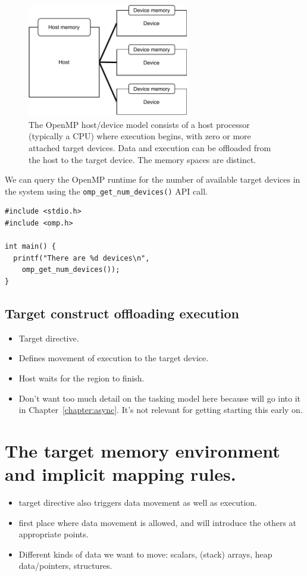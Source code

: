 \begin{figure}[t]
\label{fig:host_device}
\centerline{\includegraphics[width=200pt]{figures/host_device.pdf}}
\caption[The OpenMP host/device model consits of a host processor (typically a CPU) where execution begins, with zero or more attached target devices.
Data and execution can be offloaded from the host to the target device.
The memory spaces are distinct.]
{The OpenMP host/device model consists of a host processor (typically a CPU) where execution begins, with zero or more attached target devices.
Data and execution can be offloaded from the host to the target device.
The memory spaces are distinct.}
\end{figure}

We can query the OpenMP runtime for the number of available target devices in the system using the \texttt{omp\_get\_num\_devices()} API call.

\begin{verbatim}
#include <stdio.h>
#include <omp.h>

int main() {
  printf("There are %d devices\n",
    omp_get_num_devices());
}
\end{verbatim}

\subsection{Target construct offloading execution}
\begin{itemize}
  \item Target directive.
  \item Defines movement of execution to the target device.
  \item Host waits for the region to finish.
  \item Don't want too much detail on the tasking model here because will go into it in Chapter~\ref{chapter:async}. It's not relevant for getting starting this early on.
\end{itemize}

\section{The target memory environment and implicit mapping rules.}
\begin{itemize}
  \item target directive also triggers data movement as well as execution.
  \item first place where data movement is allowed, and will introduce the others at appropriate points.
  \item Different kinds of data we want to move: scalars, (stack) arrays, heap data/pointers, structures.
\end{itemize}

